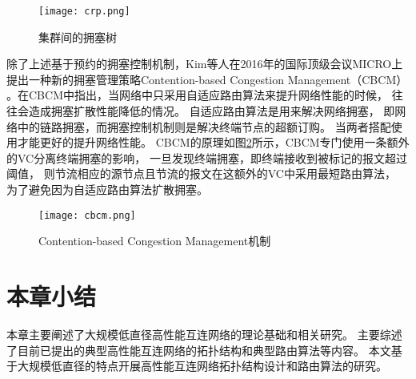 \begin{figure}[htp]
  \centering
    \texttt{[image: crp.png]}
    \caption{集群间的拥塞树}
       \label{crp}
\end{figure}

除了上述基于预约的拥塞控制机制，Kim等人在2016年的国际顶级会议MICRO上
提出一种新的拥塞管理策略Contention-based Congestion Management（CBCM）
。在CBCM中指出，当网络中只采用自适应路由算法来提升网络性能的时候，
往往会造成拥塞扩散性能降低的情况。
自适应路由算法是用来解决网络拥塞，
即网络中的链路拥塞，而拥塞控制机制则是解决终端节点的超额订购。
当两者搭配使用才能更好的提升网络性能。
CBCM的原理如图\ref{cbcm}所示，CBCM专门使用一条额外的VC分离终端拥塞的影响，
一旦发现终端拥塞，即终端接收到被标记的报文超过阈值，
则节流相应的源节点且节流的报文在这额外的VC中采用最短路由算法，
为了避免因为自适应路由算法扩散拥塞。

\begin{figure}[htp]
  \centering
    \texttt{[image: cbcm.png]}
    \caption{Contention-based Congestion Management机制}
       \label{cbcm}
\end{figure}

\section{本章小结}
本章主要阐述了大规模低直径高性能互连网络的理论基础和相关研究。
主要综述了目前已提出的典型高性能互连网络的拓扑结构和典型路由算法等内容。
本文基于大规模低直径的特点开展高性能互连网络拓扑结构设计和路由算法的研究。
